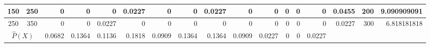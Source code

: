 \begin{table}[ht]
\begin{adjustbox}{width = \textwidth, center}
\begin{tabular}{|cc|r|r|r|r|r|r|r|r|r|r|r|r|r|r|r|}
        \rowcolor[HTML]{FFFFFF} 
        \cellcolor[HTML]{D0E0E3}150            & \cellcolor[HTML]{EBF1FC}250            & 0                                              & 0                                              & 0                                              & \cellcolor[HTML]{C7E9D8}0.0227                 & 0                                              & 0                                              & \cellcolor[HTML]{C7E9D8}0.0227                 & 0                                               & 0                                               & 0                                               & 0                                               & 0                                               & \cellcolor[HTML]{D9D2E9}0.0455                                                  & \cellcolor[HTML]{D9D2E9}200                                             & \cellcolor[HTML]{D9D2E9}9.090909091                                                              \\ \hline
        \rowcolor[HTML]{FFFFFF} 
        \cellcolor[HTML]{D0E0E3}250            & \cellcolor[HTML]{EBF1FC}350            & 0                                              & 0                                              & \cellcolor[HTML]{C7E9D8}0.0227                 & 0                                              & 0                                              & 0                                              & 0                                              & 0                                               & 0                                               & 0                                               & 0                                               & 0                                               & \cellcolor[HTML]{D9D2E9}0.0227                                                  & \cellcolor[HTML]{D9D2E9}300                                             & \cellcolor[HTML]{D9D2E9}6.818181818                                                              \\ \hline
        \multicolumn{2}{|c|}{\cellcolor[HTML]{FFF2CC}$\widehat{P}(X)$}                  & \cellcolor[HTML]{FFF2CC}0.0682                 & \cellcolor[HTML]{FFF2CC}0.1364                 & \cellcolor[HTML]{FFF2CC}0.1136                 & \cellcolor[HTML]{FFF2CC}0.1818                 & \cellcolor[HTML]{FFF2CC}0.0909                 & \cellcolor[HTML]{FFF2CC}0.1364                 & \cellcolor[HTML]{FFF2CC}0.1364                 & \cellcolor[HTML]{FFF2CC}0.0909                  & \cellcolor[HTML]{FFF2CC}0.0227                  & \cellcolor[HTML]{FFF2CC}0                       & \cellcolor[HTML]{FFF2CC}0                       & \cellcolor[HTML]{FFF2CC}0.0227                  & \multicolumn{1}{l|}{}                                                           & \multicolumn{1}{l|}{}                                                   & \multicolumn{1}{l|}{}                                                                            \\ \hline

\end{tabular}
\end{adjustbox}
\end{table}
